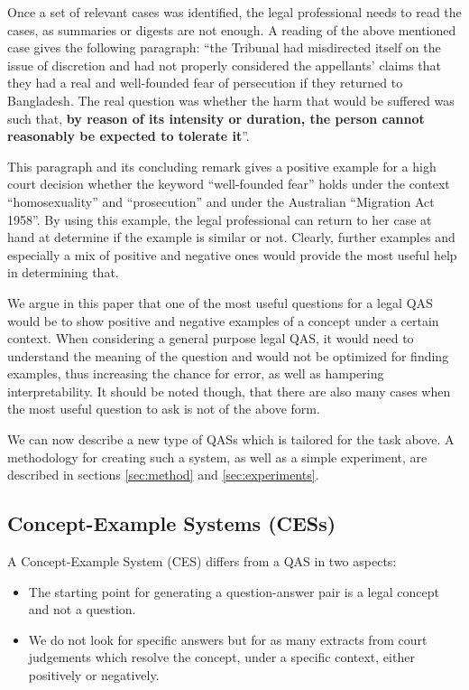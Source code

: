Once a set of relevant cases was identified, the legal professional needs to read the cases, as summaries or digests are not enough.
A reading of the above mentioned case gives the following paragraph: ``the Tribunal had misdirected itself on the issue of discretion and had not properly considered the appellants’ claims that they had a real and well-founded fear of persecution if they returned to Bangladesh. The real question was whether the harm that would be suffered was such that, {\bf by reason of its intensity or duration, the person cannot reasonably be expected to tolerate it}''.

This paragraph and its concluding remark gives a positive example for a high court decision whether the keyword ``well-founded fear'' holds under the context ``homosexuality'' and ``prosecution'' and under the Australian ``Migration Act 1958''. By using this example, the legal professional can return to her case at hand at determine if the example is similar or not. Clearly, further examples and especially a mix of positive and negative ones would provide the most useful help in determining that.

We argue in this paper that one of the most useful questions for a legal QAS would be to show positive and negative examples of a concept under a certain context. When considering a general purpose legal QAS, it would need to understand the meaning of the question and would not be optimized for finding examples, thus increasing the chance for error, as well as hampering interpretability. It should be noted though, that there are also many cases when the most useful question to ask is not of the above form.

We can now describe a new type of QASs which is tailored for the task above. A methodology for creating such a system, as well as a simple experiment, are described in sections \ref{sec:method} and \ref{sec:experiments}.

\subsection{Concept-Example Systems (CESs)}

A Concept-Example System (CES) differs from a QAS in two aspects:

\begin{itemize}
 \item The starting point for generating a question-answer pair is a legal concept and not a question.
 \item We do not look for specific answers but for as many extracts from court judgements which resolve the concept, under a specific context, either positively or negatively.
\end{itemize}

